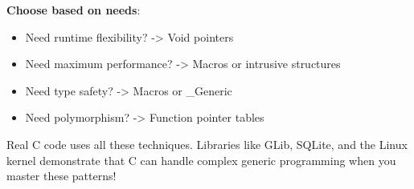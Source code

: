 \textbf{Choose based on needs}:
\begin{itemize}
    \item Need runtime flexibility? -> Void pointers
    \item Need maximum performance? -> Macros or intrusive structures
    \item Need type safety? -> Macros or \_Generic
    \item Need polymorphism? -> Function pointer tables
\end{itemize}

Real C code uses all these techniques. Libraries like GLib, SQLite, and the Linux kernel demonstrate that C can handle complex generic programming when you master these patterns!
